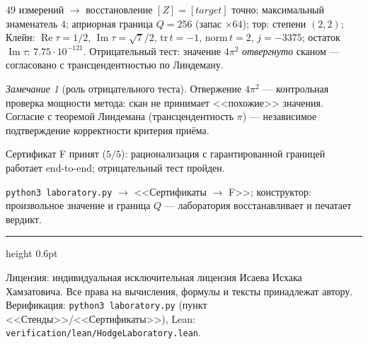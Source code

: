 \documentclass[11pt,a4paper]{article}
\theoremstyle{plain}
\theoremstyle{definition}
\theoremstyle{remark}
\newtheorem{remark}[theorem]{Замечание}
\newcommand{\im}{\operatorname{Im}}
\newcommand{\re}{\operatorname{Re}}
\begin{document}
\begin{databox}
$49$ измерений $\to$ восстановление $[Z]=[target]$ точно;
максимальный знаменатель $4$; априорная граница $Q=256$ (запас
$\times64$); тор: степени $(2,2)$; Клейн: $\re\tau=1/2$,
$\im\tau=\sqrt7/2$, $\mathrm{tr}\,t=-1$, $\mathrm{norm}\,t=2$,
$j=-3375$; остаток $\im\tau$: $7.75\cdot10^{-121}$.
Отрицательный тест: значение $4\pi^2$ \emph{отвергнуто} сканом ---
согласовано с трансцендентностью по Линдеману.
\end{databox}

\begin{remark}[роль отрицательного теста]
Отвержение $4\pi^2$ --- контрольная проверка мощности метода: скан
не принимает <<похожие>> значения. Согласие с теоремой Линдемана
(трансцендентность $\pi$) --- независимое подтверждение
корректности критерия приёма.
\end{remark}

\begin{statusbox}[итог]
Сертификат F принят ($5/5$): рационализация с гарантированной
границей работает end-to-end; отрицательный тест пройден.
\end{statusbox}

\begin{verifybox}
\texttt{python3 laboratory.py} $\to$ <<Сертификаты $\to$ F>>;
конструктор: произвольное значение и граница $Q$ --- лаборатория
восстанавливает и печатает вердикт.
\end{verifybox}

\vfill
{\color{linkblue}\hrule height 0.6pt}
\vspace{0.5em}
{\small\color{gray}
Лицензия: индивидуальная исключительная лицензия Исаева Исхака Хамзатовича.
Все права на вычисления, формулы и тексты принадлежат автору.
Верификация: \texttt{python3 laboratory.py} (пункт <<Стенды>>/<<Сертификаты>>),
Lean: \texttt{verification/lean/HodgeLaboratory.lean}.
}
\end{document}
